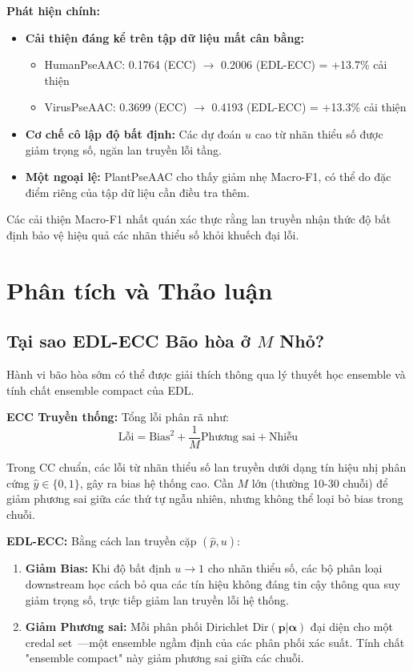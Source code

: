 \documentclass[conference]{IEEEtran}
\begin{document}
\textbf{Phát hiện chính:}
\begin{itemize}
    \item \textbf{Cải thiện đáng kể trên tập dữ liệu mất cân bằng:}
    \begin{itemize}
        \item HumanPseAAC: 0.1764 (ECC) $\to$ 0.2006 (EDL-ECC) = +13.7\% cải thiện
        \item VirusPseAAC: 0.3699 (ECC) $\to$ 0.4193 (EDL-ECC) = +13.3\% cải thiện
    \end{itemize}
    \item \textbf{Cơ chế cô lập độ bất định:} Các dự đoán $u$ cao từ nhãn thiểu số được giảm trọng số, ngăn lan truyền lỗi tầng.
    \item \textbf{Một ngoại lệ:} PlantPseAAC cho thấy giảm nhẹ Macro-F1, có thể do đặc điểm riêng của tập dữ liệu cần điều tra thêm.
\end{itemize}

Các cải thiện Macro-F1 nhất quán xác thực rằng lan truyền nhận thức độ bất định bảo vệ hiệu quả các nhãn thiểu số khỏi khuếch đại lỗi.

\section{Phân tích và Thảo luận}

\subsection{Tại sao EDL-ECC Bão hòa ở $M$ Nhỏ?}

Hành vi bão hòa sớm có thể được giải thích thông qua lý thuyết học ensemble và tính chất ensemble compact của EDL.

\textbf{ECC Truyền thống:} Tổng lỗi phân rã như:
\begin{equation}
\text{Lỗi} = \text{Bias}^2 + \frac{1}{M}\text{Phương sai} + \text{Nhiễu}
\end{equation}

Trong CC chuẩn, các lỗi từ nhãn thiểu số lan truyền dưới dạng tín hiệu nhị phân cứng $\hat{y} \in \{0,1\}$, gây ra bias hệ thống cao. Cần $M$ lớn (thường 10-30 chuỗi) để giảm phương sai giữa các thứ tự ngẫu nhiên, nhưng không thể loại bỏ bias trong chuỗi.

\textbf{EDL-ECC:} Bằng cách lan truyền cặp $(\hat{p}, u)$:
\begin{enumerate}
    \item \textbf{Giảm Bias:} Khi độ bất định $u \to 1$ cho nhãn thiểu số, các bộ phân loại downstream học cách bỏ qua các tín hiệu không đáng tin cậy thông qua suy giảm trọng số, trực tiếp giảm lan truyền lỗi hệ thống.
    \item \textbf{Giảm Phương sai:} Mỗi phân phối Dirichlet $\text{Dir}(\mathbf{p}|\boldsymbol{\alpha})$ đại diện cho một credal set~\cite{josang2016subjective}—một ensemble ngầm định của các phân phối xác suất. Tính chất "ensemble compact" này giảm phương sai giữa các chuỗi.
\end{enumerate}
\end{document}
